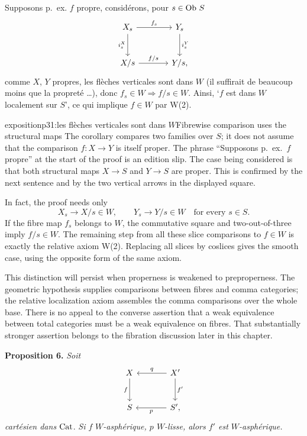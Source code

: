 \leavevmode{}Supposons p.~ex. $f$ propre, considérons, pour $s\in\operatorname{Ob}\,S$
\[
\begin{tikzcd}[row sep=large, column sep=large]
X_s \arrow[r, "f_s"] \arrow[d, "i_s^X"'] & Y_s \arrow[d, "i_s^Y"] \\
X/s \arrow[r, "f/s"] & Y/s,
\end{tikzcd}
\]
comme $X$, $Y$ propres, les flèches verticales sont dans $W$ (il suffirait de beaucoup moins que la propreté \dots), donc $f_s\in W\Longrightarrow f/s\in W$. Ainsi, `$f$ est dans $W$ localement sur $S$', ce qui implique $f\in W$ par W(2).

\begin{dcomment}{exposition}{p31:les flèches verticales sont dans $W$}{Fibrewise comparison uses the structural maps}
The corollary compares two families over $S$; it does not assume that the comparison $f:X\to Y$ is itself proper. The phrase ``Supposons p.~ex.\ $f$ propre'' at the start of the proof is an edition slip. The case being considered is that both structural maps $X\to S$ and $Y\to S$ are proper. This is confirmed by the next sentence and by the two vertical arrows in the displayed square.

In fact, the proof needs only
\[
 X_s\longrightarrow X/s\in W,
 \qquad Y_s\longrightarrow Y/s\in W
 \quad\text{for every }s\in S.
\]
If the fibre map $f_s$ belongs to $W$, the commutative square and two-out-of-three imply $f/s\in W$. The remaining step from all these slice comparisons to $f\in W$ is exactly the relative axiom W(2). Replacing all slices by coslices gives the smooth case, using the opposite form of the same axiom.

This distinction will persist when properness is weakened to preproperness. The geometric hypothesis supplies comparisons between fibres and comma categories; the relative localization axiom assembles the comma comparisons over the whole base. There is no appeal to the converse assertion that a weak equivalence between total categories must be a weak equivalence on fibres. That substantially stronger assertion belongs to the fibration discussion later in this chapter.
\end{dcomment}


\textbf{Proposition 6.} \textit{Soit}
\[
\begin{tikzcd}[row sep=large, column sep=large]
X & X' \arrow[l, "q"'] \arrow[d, "f'"] \\
S \arrow[from=u, "f"'] & S', \arrow[l, "p"]
\end{tikzcd}
\]
\textit{cartésien dans} $\mathrm{Cat}$. \textit{Si $f$} \textit{$W$-asphérique, $p$ $W$-lisse, alors $f'$ est $W$-asphérique.}

